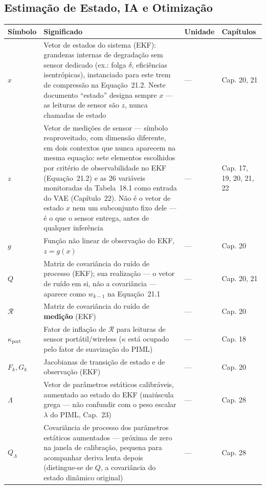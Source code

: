 \documentclass[12pt,a4paper]{article}
\numberwithin{equation}{section}
\numberwithin{table}{section}
\numberwithin{figure}{section}
\begin{document}
{{\subsection*{Estimação de Estado, IA e Otimização}
\begin{longtable}{>{\raggedright\arraybackslash}p{2.8cm} >{\raggedright\arraybackslash}p{5.3cm} >{\raggedright\arraybackslash}p{2.1cm} >{\raggedright\arraybackslash}p{4.2cm}}
	\toprule
	\textbf{Símbolo} & \textbf{Significado} & \textbf{Unidade} & \textbf{Capítulos} \\ \midrule
	\endhead
	$x$ & Vetor de estados do sistema (EKF): grandezas internas de degradação sem sensor dedicado (ex.: folga $\delta$, eficiências isentrópicas), instanciado para este trem de compressão na Equação~21.2. Neste documento ``estado'' designa sempre $x$ — as leituras de sensor são $z$, nunca chamadas de estado & --- & Cap. 20, 21 \\
	$z$ & Vetor de medições de sensor — símbolo reaproveitado, com dimensão diferente, em dois contextos que nunca aparecem na mesma equação: sete elementos escolhidos por critério de observabilidade no EKF (Equação~21.2) e as 26 variáveis monitoradas da Tabela~18.1 como entrada do VAE (Capítulo~22). Não é o vetor de estado $x$ nem um subconjunto fixo dele — é o que o sensor entrega, antes de qualquer inferência & --- & Cap. 17, 19, 20, 21, 22 \\
	$g$\dag & Função não linear de observação do EKF, $z=g(x)$ & --- & Cap. 20 \\
	$Q$ & Matriz de covariância do ruído de processo (EKF); sua realização — o vetor de ruído em si, não a covariância — aparece como $w_{k-1}$ na Equação~21.1 & --- & Cap. 20, 21 \\
	$\mathcal{R}$\dag & Matriz de covariância do ruído de \textbf{medição} (EKF) & --- & Cap. 20 \\
	$\kappa_{\text{port}}$\dag & Fator de inflação de $\mathcal{R}$ para leituras de sensor portátil/wireless ($\kappa$ está ocupado pelo fator de suavização do PIML) & --- & Cap. 18 \\
	$F_k, G_k$ & Jacobianas de transição de estado e de observação (EKF) & --- & Cap. 20 \\
	$\Lambda$ & Vetor de parâmetros estáticos calibráveis, aumentado ao estado do EKF (maiúscula grega — não confundir com o peso escalar $\lambda$ do PIML, Cap.~23) & --- & Cap. 28 \\
	$Q_\Lambda$\dag & Covariância de processo dos parâmetros estáticos aumentados — próxima de zero na janela de calibração, pequena para acompanhar deriva lenta depois (distingue-se de $Q$, a covariância do estado dinâmico original) & --- & Cap. 28 \\

\end{longtable}}}
\end{document}

